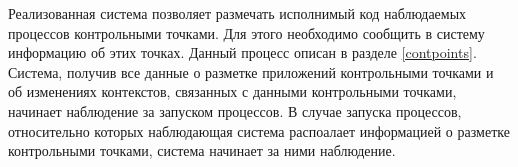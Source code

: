 Реализованная система позволяет размечать исполнимый код
наблюдаемых процессов контрольными точками. Для этого необходимо
сообщить в систему информацию об этих точках. Данный процесс описан
в разделе \ref{contpoints}. Система, получив все данные о
разметке приложений контрольными точками и об изменениях
контекстов, связанных с данными контрольными точками,
начинает наблюдение за запуском процессов. В случае запуска
процессов, относительно которых наблюдающая система распоалает
информацией о разметке контрольными точками, система
начинает за ними наблюдение.

\begin{comment}
\section {Особенности реализации} 

\subsection{Описание подсистемы utrace-uprobes}

\bigskip
Как было сказано ранее, система utrace-uprobes используется 
для определения "попадания" на контрольные точки.
При этом utrace предоставляет средства создания 
отладчиков в виде модулей ядра, в то время, как 
uprobes использует utrace для расставления точек 
останова в теле процесса и наблюдения за попаданием 
исполнения на них. 
Рассмотрим особенности использования этой системы 
более подробно.
Как было сказано выше, utrace является подсистемой 
ядра, позволяющей создавать отладчики, работающие в 
пространстве ядра в виде модулей. При этом, модуль 
должен реализовать некоторые функции-обработчики 
событий, происходящих в отлаживаемом приложении. 

Пример:

\bigskip
\begin{lstlisting}
u32 (*report_syscall_entry)(struct utrace_attached_engine *engine,
				struct task_struct *tsk,
				struct pt_regs *regs);

\end{lstlisting}

\bigskip
Как только отлаживаемый процесс совершит системный вызов, будет вызвана 
соответствующая функция отлаживаемого движка - {\texttt report\_sysc
all\_entry()} (разумеется, если она была зарегистрирована). Вызов 
данного обработчика происходит до выполнения системного вызова, 
отладчик может безопасно получать доступ к остановленному отлаживаемому 
процессу. Функция-обработчик возвращает битовую маску, которая определяет, что 
должно произойти далее~--- можно изменять состояние отладки, 
прекращать отладку, скрывать событие от других отладочных 
движков и многое другое. 


\end{comment}
